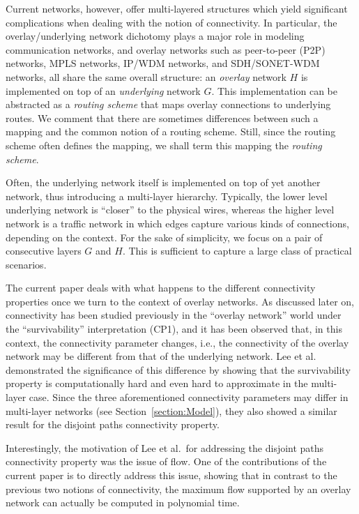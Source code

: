 \LongVersion \documentclass[11pt]{article}
\theoremstyle{definition}
\theoremstyle{plain}
\begin{document}
Current networks, however, offer multi-layered structures which yield
significant complications when dealing with the notion of connectivity.
In particular, the overlay/underlying network dichotomy plays a major role
in modeling communication networks, and overlay networks such as peer-to-peer
(P2P) networks, MPLS networks, IP/WDM networks, and SDH/SONET-WDM networks,
all share the same overall structure:
an \emph{overlay} network $H$ is implemented on top of an \emph{underlying}
network $G$.
This implementation can be abstracted as a \emph{routing scheme} that maps
overlay connections to underlying routes.
We comment that there are sometimes differences between such a mapping and the common notion of a routing scheme. Still, since the routing scheme often defines the mapping,
we shall term this mapping the
\emph{routing scheme}.

Often, the underlying network itself is implemented on top of yet another
network, thus introducing a multi-layer hierarchy.
Typically, the lower level underlying network is ``closer'' to the physical
wires, whereas the higher level network is a traffic network in which edges
capture various kinds of connections, depending on the context.
For the sake of simplicity, we focus on a pair of consecutive layers $G$ and
$H$.
This is sufficient to capture a large class of practical scenarios.

The current paper deals with what happens to the different connectivity
properties once we turn to the context of overlay networks.
As discussed later on, connectivity has been studied previously in the
``overlay network'' world under the ``survivability'' interpretation (CP1),
and it has been observed that, in this context, the connectivity parameter
changes, i.e., the connectivity of the overlay network may be different
from that of the underlying network.
Lee et al.\ \cite{prev} demonstrated the significance of this difference by
showing that the survivability property is computationally hard and even hard
to approximate in the multi-layer case.
Since the three aforementioned connectivity parameters may differ in
multi-layer networks (see Section~\ref{section:Model}), they also showed a
similar result for the disjoint paths connectivity property.

Interestingly, the motivation of Lee et al.\ for addressing the disjoint paths
connectivity property was the issue of flow.
One of the contributions of the current paper is to directly address this
issue, showing that in contrast to the previous two notions of connectivity,
the maximum flow supported by an overlay network can actually be computed in
polynomial time.
\end{document}
